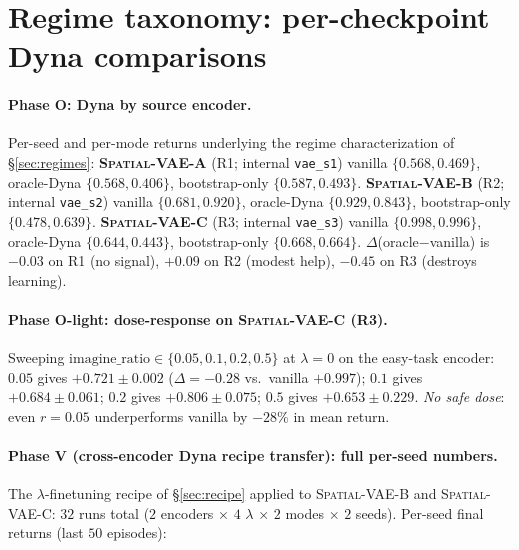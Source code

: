 \documentclass{article}
\newcommand{\srcVA}{\textsc{Spatial-VAE-A}}
\newcommand{\srcVB}{\textsc{Spatial-VAE-B}}
\newcommand{\srcVC}{\textsc{Spatial-VAE-C}}
\begin{document}
\section{Regime taxonomy: per-checkpoint Dyna comparisons}\label{app:regimes-extra}

\paragraph{Phase O: Dyna by source encoder.} Per-seed and per-mode returns underlying the regime characterization of \S\ref{sec:regimes}: \textbf{\srcVA} (R1; internal \texttt{vae\_s1}) vanilla $\{0.568, 0.469\}$, oracle-Dyna $\{0.568, 0.406\}$, bootstrap-only $\{0.587, 0.493\}$. \textbf{\srcVB} (R2; internal \texttt{vae\_s2}) vanilla $\{0.681, 0.920\}$, oracle-Dyna $\{0.929, 0.843\}$, bootstrap-only $\{0.478, 0.639\}$. \textbf{\srcVC} (R3; internal \texttt{vae\_s3}) vanilla $\{0.998, 0.996\}$, oracle-Dyna $\{0.644, 0.443\}$, bootstrap-only $\{0.668, 0.664\}$. $\Delta$(oracle$-$vanilla) is $-0.03$ on R1 (no signal), $+0.09$ on R2 (modest help), $-0.45$ on R3 (destroys learning).

\paragraph{Phase O-light: dose-response on \srcVC{} (R3).} Sweeping $\mathrm{imagine\_ratio} \in \{0.05, 0.1, 0.2, 0.5\}$ at $\lambda{=}0$ on the easy-task encoder: $0.05$ gives $+0.721 \pm 0.002$ ($\Delta = -0.28$ vs.\ vanilla $+0.997$); $0.1$ gives $+0.684 \pm 0.061$; $0.2$ gives $+0.806 \pm 0.075$; $0.5$ gives $+0.653 \pm 0.229$. \emph{No safe dose}: even $r{=}0.05$ underperforms vanilla by $-28\%$ in mean return.

\paragraph{Phase V (cross-encoder Dyna recipe transfer): full per-seed numbers.} The $\lambda$-finetuning recipe of \S\ref{sec:recipe} applied to \srcVB{} and \srcVC{}: $32$ runs total ($2$ encoders $\times$ $4$ $\lambda$ $\times$ $2$ modes $\times$ $2$ seeds). Per-seed final returns (last $50$ episodes):
\end{document}
